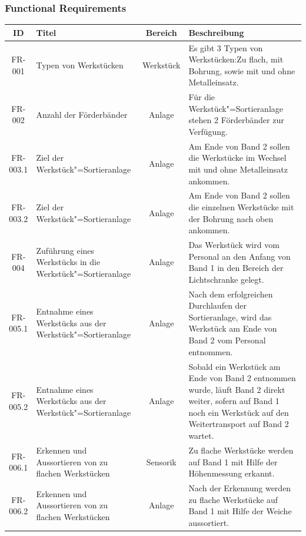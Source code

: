 \documentclass[oneside,a4paper,titlepage]{scrartcl}              %
\begin{document}
\subsubsection{Functional Requirements}
\begin{small}
  \begin{center}
    \begin{longtable}{|c|p{4cm}|c|p{7cm}|}
      \hline
      \textbf{ID} & \textbf{Titel} & \textbf{Bereich} & \textbf{Beschreibung}\\
      \toprule
      \endhead
      \hline
      FR-001 & Typen von Werkstücken & Werkstück & Es gibt 3 Typen von Werkstücken:Zu flach, mit Bohrung, sowie mit und ohne Metalleinsatz.\\
      \hline
      \rowcolor{lightgray} FR-002 & Anzahl der Förderbänder & Anlage & Für die Werkstück"=Sortieranlage stehen 2 Förderbänder zur Verfügung.\\
      \hline
      FR-003.1 & Ziel der Werkstück"=Sortieranlage & Anlage & Am Ende von Band 2 sollen die Werkstücke im Wechsel mit und ohne Metalleinsatz ankommen.\\
      \hline
      FR-003.2 & Ziel der Werkstück"=Sortieranlage & Anlage & Am Ende von Band 2 sollen die einzelnen Werkstücke mit der Bohrung nach oben ankommen.\\
      \hline
      \rowcolor{lightgray} FR-004 & Zuführung eines Werkstücks in die Werkstück"=Sortieranlage & Anlage & Das Werkstück wird vom Personal an den Anfang von Band 1 in den Bereich der Lichtschranke gelegt.\\
      \hline
      FR-005.1 & Entnahme eines Werkstücks aus der Werkstück"=Sortieranlage & Anlage & Nach dem erfolgreichen Durchlaufen der Sortieranlage, wird das Werkstück am Ende von Band 2 vom Personal entnommen.\\
      \hline
      FR-005.2 & Entnahme eines Werkstücks aus der Werkstück"=Sortieranlage & Anlage & Sobald ein Werkstück am Ende von Band 2 entnommen wurde, läuft Band 2 direkt weiter, sofern auf Band 1 noch ein Werkstück auf den Weitertransport auf Band 2 wartet.\\
      \hline
      \rowcolor{lightgray} FR-006.1 & Erkennen und Aussortieren von zu flachen Werkstücken & Sensorik & Zu flache Werkstücke werden auf Band 1 mit Hilfe der Höhenmessung erkannt.\\
      \hline
      \rowcolor{lightgray} FR-006.2 & Erkennen und Aussortieren von zu flachen Werkstücken & Anlage & Nach der Erkennung werden zu flache Werkstücke auf Band 1 mit Hilfe der Weiche aussortiert.\\

\end{longtable}
\end{center}
\end{small}
\end{document}
